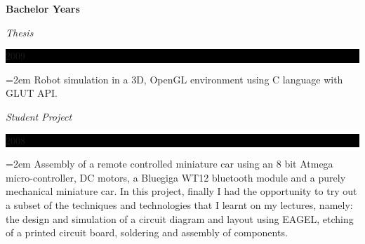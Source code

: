 \documentclass[paper=a4,fontsize=11pt]{scrartcl}	 			%
\newlength{\spacebox}
\newcommand{\sepspace}{\vspace*{1em}}			%
\newcommand{\NewPart}[1]{\section*{\uppercase{#1}}}
\newcommand{\PersonalEntry}[2]{
		\noindent\hangindent=2em\hangafter=0 		%
		\parbox{\spacebox}{						%
		\textit{#1}}								%
		\hspace{1.5em} #2 \par}					%
\newcommand{\SkillsEntry}[2]{						%
		\noindent\hangindent=2em\hangafter=0 		%
		\parbox{\spacebox}{						%
		\textit{#1}}								%
		\hspace{1.5em} #2 \par}					%
\newcommand{\EducationEntry}[4]{
		\noindent \textbf{#1} \par 					%
		\noindent \textit{#3} \hfill					%
		\colorbox{Black}{%
			\parbox{6em}{%
			\hfill\color{White}#2}} \par				%
		\noindent\hangindent=2em\hangafter=0 \small #4 	%
		\normalsize \par}
\begin{document}
\sepspace
\EducationEntry{Bachelor Years}{2009}{Thesis}{Robot simulation in a 3D, OpenGL environment using C language with GLUT API.}
\EducationEntry{}{2008}{Student Project}{Assembly of a remote controlled miniature car using an 8 bit Atmega micro-controller, DC motors, a Bluegiga WT12 bluetooth module and a purely mechanical miniature car. In this project, finally I had the opportunity to try out a subset of the techniques and technologies that I learnt on my lectures, namely: the design and simulation of a circuit diagram and layout using EAGEL, etching of a printed circuit board, soldering and assembly of components.}


\end{document}
